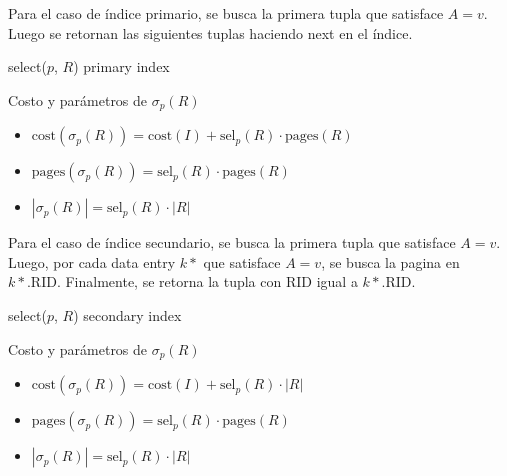 Para el caso de índice primario, se busca la primera tupla que satisface $A = v$. Luego se retornan las siguientes tuplas haciendo next en el índice.
\begin{paracol}{2}
  \begin{algorithm}
    \caption{select($p$, $R$) primary index}
    \DontPrintSemicolon
  
  
  \end{algorithm}

  \switchcolumn

  Costo y parámetros de $\sigma_p(R)$
  \begin{itemize}
    \item $\text{cost}(\sigma_p(R)) = \text{cost}(I) + \text{sel}_p(R) \cdot \text{pages}(R)$
    \item $\text{pages}(\sigma_p(R)) = \text{sel}_p(R) \cdot \text{pages}(R)$
    \item $|\sigma_p(R)| = \text{sel}_p(R) \cdot |R|$
  \end{itemize}
\end{paracol}
\pagebreak

Para el caso de índice secundario, se busca la primera tupla que satisface $A = v$. Luego, por cada data entry $k*$ que satisface $A = v$, se busca la pagina en $k*.\text{RID}$. Finalmente, se retorna la tupla con RID igual a $k*.\text{RID}$.
\begin{paracol}{2}
  \begin{algorithm}
    \caption{select($p$, $R$) secondary index}
    \DontPrintSemicolon
  
  
  \end{algorithm}

  \switchcolumn

  Costo y parámetros de $\sigma_p(R)$
  \begin{itemize}
    \item $\text{cost}(\sigma_p(R)) = \text{cost}(I) + \text{sel}_p(R) \cdot |R|$
    \item $\text{pages}(\sigma_p(R)) = \text{sel}_p(R) \cdot \text{pages}(R)$
    \item $|\sigma_p(R)| = \text{sel}_p(R) \cdot |R|$
  \end{itemize}
\end{paracol}


